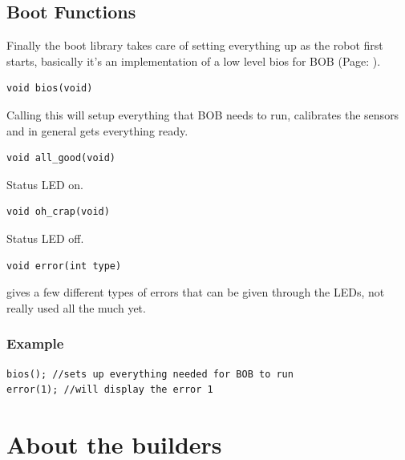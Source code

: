 \documentclass{article}
\begin{document}
\subsection{Boot Functions}
Finally the boot library takes care of setting everything up as the robot first starts, basically it's an implementation of a low level bios for BOB (Page: \pageref{boot}).\\
\begin{verbatim}void bios(void)\end{verbatim}
Calling this will setup everything that BOB needs to run, calibrates the sensors and in general gets everything ready.
\begin{verbatim}void all_good(void)\end{verbatim}
Status LED on.
\begin{verbatim}void oh_crap(void)\end{verbatim}
Status LED off.
\begin{verbatim}void error(int type)\end{verbatim}
gives a few different types of errors that can be given through the LEDs, not really used all the much yet.
\subsubsection{Example}
\begin{lstlisting}[caption={Boot examples},label=bootex,frame=bl]
bios(); //sets up everything needed for BOB to run
error(1); //will display the error 1
\end{lstlisting}

\newpage
\section{About the builders}
\end{document}
